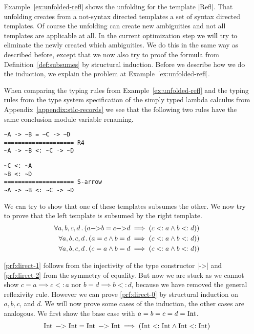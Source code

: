Example~\ref{ex:unfolded-refl} shows the unfolding for the template
\code|Refl|. That unfolding creates from a not-syntax directed
templates a set of syntax directed templates. Of course the unfolding
can create new ambiguities and not all templates are applicable at
all. In the current optimization step we will try to eliminate the
newly created which ambiguities. We do this in the same way as
described before, except that we now also try to proof the formula
from Definition~\ref{def:subsumes} by structural induction. Before we
describe how we do the induction, we explain the problem at
Example~\ref{ex:unfolded-refl}.

When comparing the typing rules from Example~\ref{ex:unfolded-refl}
and the typing rules from the type system specification of the simply
typed lambda calculus from Appendix~\ref{appendix:stlc-records} we see
that the following two rules have the same conclusion module variable
renaming.

\begin{minipage}[b]{.4\linewidth}
\begin{lstlisting}[language=sltc]
~A -> ~B = ~C -> ~D
==================== R4
~A -> ~B <: ~C -> ~D
\end{lstlisting}
\end{minipage}
\begin{minipage}[b]{.5\linewidth}
\begin{lstlisting}[language=sltc]
~C <: ~A
~B <: ~D
==================== S-arrow 
~A -> ~B <: ~C -> ~D
\end{lstlisting}
\end{minipage}

We can try to show that one of these templates subsumes the other. We
now try to prove that the left template is subsumed by the right
template.
\begin{align}
  \forall a,b,c,d \,.\, (a \text{\code|->|} b = c \text{\code|->|} d \implies (c <:
  a \land b <: d)) \label{prf:direct-0} \\
  \forall a,b,c,d \,.\, (a = c \land b = d \implies (c <: a \land b <:
  d)) \label{prf:direct-1}\\
 \forall a,b,c,d \,.\, (c = a \land b = d \implies (c <: a \land b <:
 d)) \label{prf:direct-2}
\end{align}

\ref{prf:direct-1} follows from the injectivity of the type
constructor \code|->| and \ref{prf:direct-2} from the symmetry of
equality. But now we are stuck as we cannot show $c = a \implies c <:
a$ nor $b = d \implies b <: d$, because we have removed the general
reflexivity rule. However we can prove \ref{prf:direct-0} by
structural induction on $a, b, c$, and $d$. We will now prove some
cases of the induction, the other cases are analogous. We first show
the base case with $a = b = c = d = \text{\code|Int|}$.
\begin{align}
  \text{\code|Int -> Int|} = \text{\code|Int -> Int|} \implies
  (\text{\code|Int|} <: \text{\code|Int|} \land \text{\code|Int|} <:
  \text{\code|Int|}) \label{prf:induction-base}
\end{align}

